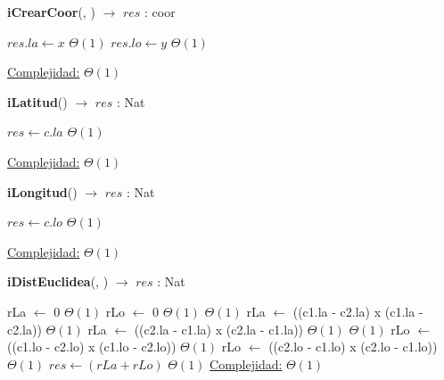 \begin{Algoritmos}

\medskip
	
  	\medskip
  
\begin{algorithm}[H]{\textbf{iCrearCoor}(, ) $\to$ $res$ : coor}
    	\begin{algorithmic}[1]
			\State $res.la \gets x$ \Comment $\Theta(1)$
			\State $res.lo \gets y$ \Comment $\Theta(1)$
			
			\medskip
			\Statex \underline{Complejidad:} $\Theta(1)$
    	\end{algorithmic}
\end{algorithm}

\begin{algorithm}[H]{\textbf{iLatitud}() $\to$ $res$ : Nat}
    	\begin{algorithmic}[1]
			\State $res \gets c.la$ \Comment $\Theta(1)$
			
			\medskip
			\Statex \underline{Complejidad:} $\Theta(1)$
    	\end{algorithmic}
\end{algorithm}

\begin{algorithm}[H]{\textbf{iLongitud}() $\to$ $res$ : Nat}
    	\begin{algorithmic}[1]
			\State $res \gets c.lo$ \Comment $\Theta(1)$
			
			\medskip
			\Statex \underline{Complejidad:} $\Theta(1)$
    	\end{algorithmic}
\end{algorithm}

\begin{algorithm}[H]{\textbf{iDistEuclidea}(, ) $\to$ $res$ : Nat}
    	\begin{algorithmic}[1]
			\State rLa $\gets$ 0	\Comment $\Theta(1)$
			\State rLo $\gets$ 0	\Comment $\Theta(1)$
				\Comment $\Theta(1)$
				\State rLa $\gets$ ((c1.la - c2.la) x (c1.la - c2.la))	\Comment $\Theta(1)$
			\Else
				\State rLa $\gets$ ((c2.la - c1.la) x (c2.la - c1.la))	\Comment $\Theta(1)$
			\EndIf
				\Comment $\Theta(1)$
				\State rLo $\gets$ ((c1.lo - c2.lo) x (c1.lo - c2.lo))	\Comment $\Theta(1)$
			\Else
				\State rLo $\gets$ ((c2.lo - c1.lo) x (c2.lo - c1.lo))	\Comment $\Theta(1)$
			\EndIf
			\State $res \gets (rLa + rLo)$	\Comment $\Theta(1)$
			\medskip
			\Statex \underline{Complejidad:} $\Theta(1)$
    	\end{algorithmic}
\end{algorithm}


\end{Algoritmos}
